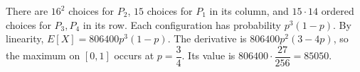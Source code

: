 There are $16^2$ choices for $P_2$, $15$ choices for $P_1$ in its column, and $15\cdot 14$ ordered choices for $P_3,P_4$ in its row. Each configuration has probability $p^3(1-p)$. By linearity, $E[X]=806400p^3(1-p)$. The derivative is $806400p^2(3-4p)$, so the maximum on $[0,1]$ occurs at $p=\dfrac{3}{4}$. Its value is $806400\cdot \dfrac{27}{256}=\boxed{85050}$.
